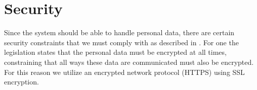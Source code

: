 
\chapter{Security}
\label{cha:security}

Since the system should be able to handle personal data, there are certain security constraints that we must comply with as described in . For one the legislation states that the personal data must be encrypted at all times, constraining that all ways these data are communicated must also be encrypted. For this reason we utilize an encrypted network protocol (HTTPS) using SSL encryption.




